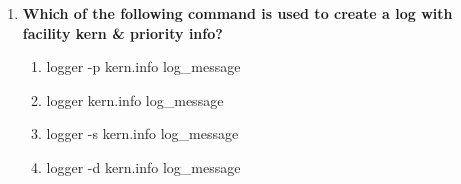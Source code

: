 \begin{flushleft}
\begin{enumerate}
		\item \textbf{Which of the following command is used to create a log with facility kern \& priority info?}
		\begin{enumerate}[label=(\alph*)]
			\item logger -p kern.info  log\_message  %
			\item logger kern.info  log\_message
			\item logger -s kern.info  log\_message
			\item logger -d kern.info  log\_message
		\end{enumerate}
		\bigskip
		\bigskip
		
	\end{enumerate}
\end{flushleft}

\newpage

